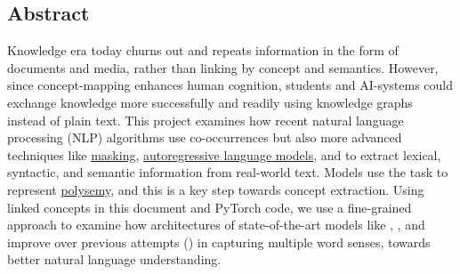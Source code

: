 
\subsection*{\hfil\hfil Abstract \hfil}\label{sec:Abstract}    


\vspace{-5pt}


Knowledge era today churns out and repeats information in the form of documents and media, rather than linking by concept and semantics. However, since concept-mapping enhances human cognition, students and AI-systems could exchange knowledge more successfully and readily using knowledge graphs instead of plain text. This project examines how recent natural language processing (NLP) algorithms use co-occurrences but also more advanced techniques like \hyperref[sec:maskedlanguagemodelMLM]{masking}, \hyperref[sec:autoregressiveLM]{autoregressive language models}, and  to extract lexical, syntactic, and semantic information from real-world text. Models use the  task to represent \hyperref[sec:Polysemy]{polysemy}, and this is a key step towards concept extraction. Using linked concepts in this document and PyTorch code, we use a fine-grained approach to examine how architectures of state-of-the-art models like , , and  improve over previous attempts () in capturing multiple word senses, towards better natural language understanding. 

